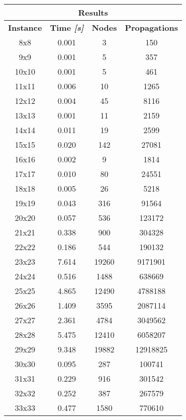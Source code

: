 \begin{center}
    \begin{tabular}{|c|c|c|c|}
        \hline
        \multicolumn{4}{|c|}{\textbf{Results}} \\
        \hline
        \textbf{Instance} & \textbf{Time \textit{[s]}} & \textbf{Nodes} & \textbf{Propagations} \\
        \hline
        8x8 & 0.001 & 3 & 150 \\ \hline
        9x9 & 0.001 & 5 & 357 \\ \hline
        10x10 & 0.001 & 5 & 461 \\ \hline
        11x11 & 0.006 & 10 & 1265 \\ \hline
        12x12 & 0.004 & 45 & 8116 \\ \hline
        13x13 & 0.001 & 11 & 2159 \\ \hline
        14x14 & 0.011 & 19 & 2599 \\ \hline
        15x15 & 0.020 & 142 & 27081 \\ \hline
        16x16 & 0.002 & 9 & 1814 \\ \hline
        17x17 & 0.010 & 80 & 24551 \\ \hline
        18x18 & 0.005 & 26 & 5218 \\ \hline
        19x19 & 0.043 & 316 & 91564 \\ \hline
        20x20 & 0.057 & 536 & 123172 \\ \hline
        21x21 & 0.338 & 900 & 304328 \\ \hline
        22x22 & 0.186 & 544 & 190132 \\ \hline
        23x23 & 7.614 & 19260 & 9171901 \\ \hline
        24x24 & 0.516 & 1488 & 638669 \\ \hline
        25x25 & 4.865 & 12490 & 4788188 \\ \hline
        26x26 & 1.409 & 3595 & 2087114 \\ \hline
        27x27 & 2.361 & 4784 & 3049562 \\ \hline
        28x28 & 5.475 & 12410 & 6058207 \\ \hline
        29x29 & 9.348 & 19882 & 12918825 \\ \hline
        30x30 & 0.095 & 287 & 100741 \\ \hline
        31x31 & 0.229 & 916 & 301542 \\ \hline
        32x32 & 0.252 & 387 & 267579 \\ \hline
        33x33 & 0.477 & 1580 & 770610 \\ \hline

\end{tabular}
\end{center}
